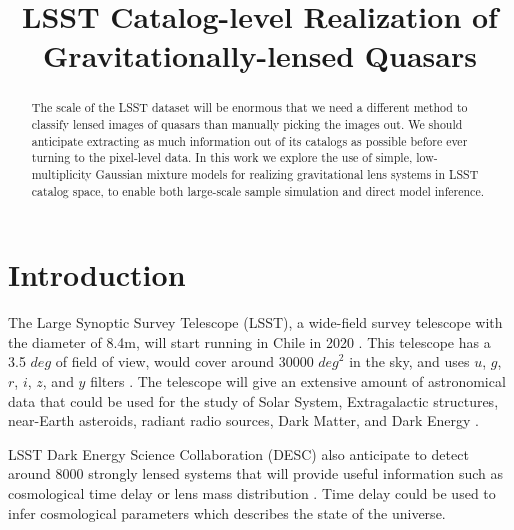 \documentclass[\docopts]{\docclass}
\begin{document}
\title{ LSST Catalog-level Realization of Gravitationally-lensed Quasars }

\maketitlepre

\begin{abstract}

The scale of the LSST dataset will be enormous that we need a different method to classify lensed images of quasars than manually picking the images out. We should anticipate extracting as much information out of its catalogs as possible before ever turning to the pixel-level data. In this work we explore the use of simple, low-multiplicity Gaussian mixture models for realizing gravitational lens systems in LSST catalog space, to enable both large-scale sample simulation and direct model inference.


\end{abstract}



\section{Introduction}
\label{sec:intro}

The Large Synoptic Survey Telescope (LSST), a wide-field survey telescope with the diameter of 8.4m, will start running in Chile in 2020 \cite{LSST_overall}. This telescope has a 3.5 $deg$ of field of view, would cover around 30000 $\textit{deg}^2$ in the sky, and uses $u$, $g$, $r$, $i$, $z$, and $y$ filters \cite{LSSTScienceBookv2}. The telescope will give an extensive amount of astronomical data that could be used for the study of Solar System, Extragalactic structures, near-Earth asteroids, radiant radio sources, Dark Matter, and Dark Energy \cite{LSSTScienceBookv2}. 

LSST Dark Energy Science Collaboration (DESC) also anticipate to detect around 8000 strongly lensed systems that will provide useful information such as cosmological time delay or lens mass distribution \cite{DESC_overall} \cite{TimeDelayOverall} \cite{Twinkles}. Time delay could be used to infer cosmological parameters \cite{Cosmology from Gravitational Lens Time Delays and Planck Data} \cite{Dissecting the Gravitational Lens B1608+656} \cite{Treu2010} which describes the state of the universe.
\end{document}
